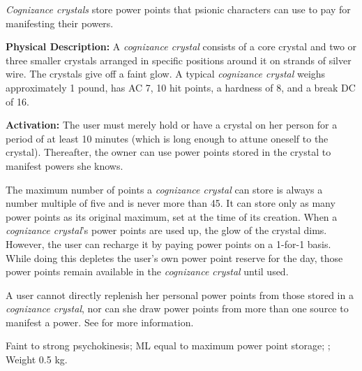 \emph{Cognizance crystals} store power points that psionic characters can use to pay for manifesting their powers.


\textbf{Physical Description:} A \emph{cognizance crystal} consists of a core crystal and two or three smaller crystals arranged in specific positions around it on strands of silver wire. The crystals give off a faint glow. A typical \emph{cognizance crystal} weighs approximately 1 pound, has AC 7, 10 hit points, a hardness of 8, and a break DC of 16.

\textbf{Activation:} The user must merely hold or have a crystal on her person for a period of at least 10 minutes (which is long enough to attune oneself to the crystal). Thereafter, the owner can use power points stored in the crystal to manifest powers she knows.

The maximum number of points a \emph{cognizance crystal} can store is always a number multiple of five and is never more than 45. It can store only as many power points as its original maximum, set at the time of its creation. When a \emph{cognizance crystal}'s power points are used up, the glow of the crystal dims. However, the user can recharge it by paying power points on a 1-for-1 basis. While doing this depletes the user's own power point reserve for the day, those power points remain available in the \emph{cognizance crystal} until used.

A user cannot directly replenish her personal power points from those stored in a \emph{cognizance crystal}, nor can she draw power points from more than one source to manifest a power. See  for more information.

Faint to strong psychokinesis; ML equal to maximum power point storage; ; Weight 0.5 kg.
